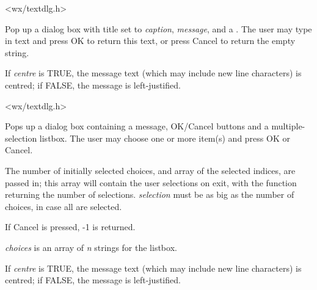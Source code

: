 
<wx/textdlg.h>

\label{wxgettextfromuser}


Pop up a dialog box with title set to {\it caption}, {\it message}, and a
.  The user may type in text and press OK to return this text,
or press Cancel to return the empty string.

If {\it centre} is TRUE, the message text (which may include new line characters)
is centred; if FALSE, the message is left-justified.


<wx/textdlg.h>

\label{wxgetmultiplechoice}


Pops up a dialog box containing a message, OK/Cancel buttons and a multiple-selection
listbox. The user may choose one or more item(s) and press OK or Cancel.

The number of initially selected choices, and array of the selected indices,
are passed in; this array will contain the user selections on exit, with
the function returning the number of selections. {\it selection} must be
as big as the number of choices, in case all are selected.

If Cancel is pressed, -1 is returned.

{\it choices} is an array of {\it n} strings for the listbox.

If {\it centre} is TRUE, the message text (which may include new line characters)
is centred; if FALSE, the message is left-justified.

